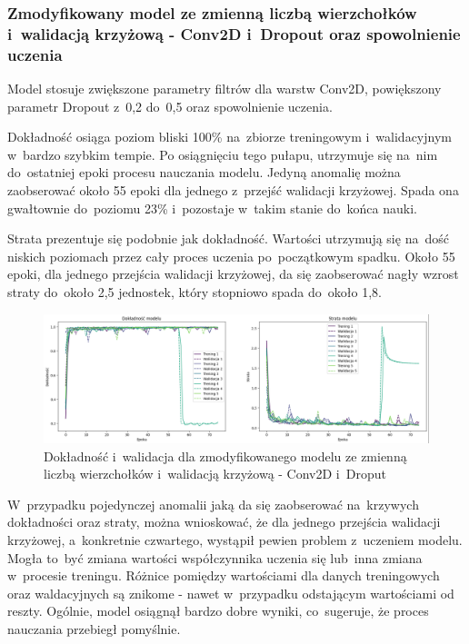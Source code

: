 \subsubsection{Zmodyfikowany model ze zmienną liczbą wierzchołków i~walidacją krzyżową - Conv2D i~Dropout oraz spowolnienie uczenia}

Model stosuje zwiększone parametry filtrów dla warstw Conv2D, powiększony parametr Dropout z~0,2 do~0,5
oraz spowolnienie uczenia.

Dokładność osiąga poziom bliski 100\% na~zbiorze treningowym i~walidacyjnym w~bardzo szybkim tempie.
Po osiągnięciu tego pułapu, utrzymuje się na~nim do~ostatniej epoki procesu nauczania modelu.
Jedyną anomalię można zaobserować około 55 epoki dla jednego z~przejść walidacji krzyżowej.
Spada ona gwałtownie do~poziomu 23\% i~pozostaje w~takim stanie do~końca nauki.

Strata prezentuje się podobnie jak dokładność.
Wartości utrzymują się na~dość niskich poziomach przez cały proces uczenia po~początkowym spadku.
Około 55 epoki, dla jednego przejścia walidacji krzyżowej,
da się zaobserować nagły wzrost straty do~około 2,5 jednostek, który stopniowo spada do~około 1,8.

\begin{figure}[ht]
	\centering
	\includegraphics[width=15.5cm]{resources/tests/images/v4/multiple_edges_crossvalid_1_img.png}
	\caption{Dokładność i~walidacja dla zmodyfikowanego modelu ze zmienną liczbą wierzchołków i~walidacją krzyżową - Conv2D i~Droput}
	\label{Fig:tests-csvar-1a}
\end{figure}
\FloatBarrier

W~przypadku pojedynczej anomalii jaką da się zaobserować na~krzywych dokładności oraz straty,
można wnioskować, że dla jednego przejścia walidacji krzyżowej, a~konkretnie czwartego, wystąpił pewien problem z~uczeniem modelu.
Mogła to~być zmiana wartości współczynnika uczenia się lub~inna zmiana w~procesie treningu.
Różnice pomiędzy wartościami dla danych treningowych oraz waldacyjnych są znikome - nawet w~przypadku odstającym wartościami od reszty.
Ogólnie, model osiągnął bardzo dobre wyniki, co~sugeruje, że proces nauczania przebiegł pomyślnie.

